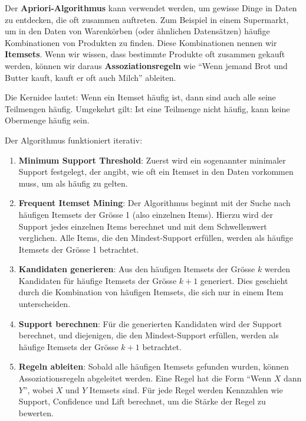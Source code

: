 \begin{mydefinition}[Apriori]
    Der \textbf{Apriori-Algorithmus} kann verwendet werden, um gewisse Dinge in Daten zu entdecken, die oft zusammen auftreten. Zum Beispiel in einem Supermarkt, um in den Daten von Warenkörben (oder ähnlichen Datensätzen) häufige Kombinationen von Produkten zu finden. Diese Kombinationen nennen wir \textbf{Itemsets}. Wenn wir wissen, dass bestimmte Produkte oft zusammen gekauft werden, können wir daraus \textbf{Assoziationsregeln} wie \enquote{Wenn jemand Brot und Butter kauft, kauft er oft auch Milch} ableiten.

    Die Kernidee lautet: Wenn ein Itemset häufig ist, dann sind auch alle seine Teilmengen häufig.
    Umgekehrt gilt: Ist eine Teilmenge nicht häufig, kann keine Obermenge häufig sein.

    Der Algorithmus funktioniert iterativ:
    \begin{enumerate}
        \item \textbf{Minimum Support Threshold}: Zuerst wird ein sogenannter minimaler Support festgelegt, der angibt, wie oft ein Itemset in den Daten vorkommen muss, um als häufig zu gelten.
        \item \textbf{Frequent Itemset Mining}: Der Algorithmus beginnt mit der Suche nach häufigen Itemsets der Grösse 1 (also einzelnen Items). Hierzu wird der Support jedes einzelnen Items berechnet und mit dem Schwellenwert verglichen. Alle Items, die den Mindest-Support erfüllen, werden als häufige Itemsets der Grösse 1 betrachtet.
        \item \textbf{Kandidaten generieren}: Aus den häufigen Itemsets der Grösse $k$ werden Kandidaten für häufige Itemsets der Grösse $k+1$ generiert. Dies geschieht durch die Kombination von häufigen Itemsets, die sich nur in einem Item unterscheiden.
        \item \textbf{Support berechnen}: Für die generierten Kandidaten wird der Support berechnet, und diejenigen, die den Mindest-Support erfüllen, werden als häufige Itemsets der Grösse $k+1$ betrachtet.
        \item \textbf{Regeln ableiten}: Sobald alle häufigen Itemsets gefunden wurden, können Assoziationsregeln abgeleitet werden. Eine Regel hat die Form \enquote{Wenn $X$ dann $Y$}, wobei $X$ und $Y$ Itemsets sind. Für jede Regel werden Kennzahlen wie Support, Confidence und Lift berechnet, um die Stärke der Regel zu bewerten.
    \end{enumerate}
\end{mydefinition}




